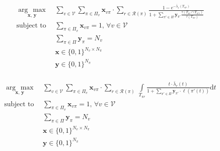 \documentclass[letterpaper, 10pt, conference]{ieeeconf}
\newcommand{\argmax}[1]{\underset{#1}{\operatorname{arg}\,\operatorname{max}}\;}
\newcommand{\Sum}[1]{\displaystyle\sum\limits_{#1}}
\newcommand{\Int}[1]{\displaystyle\int\limits_{#1}}
\newcommand{\bx}[0]{\ensuremath{\mathbf{x}}}
\newcommand{\by}[0]{\ensuremath{\mathbf{y}}}
\begin{document}
\begin{equation*}
\begin{array}{lll}
\argmax{\bx, \, \by}  & \Sum{v \in \mathcal{V}}
    \Sum{\pi \in \Pi_v} \bx_{v\pi} \cdot
    \Sum{r \in \mathcal{R}(\pi)}
    \frac{1 - e^{-\bar{\lambda}_r(T_{\pi r})}}
    {1 + \Sum{\pi' \in \Pi} \by_{\pi'} \frac{\tau(T_{\pi r} \cap T_{\pi' r})}
    {\tau(T_{\pi r})}}& \\
\text{subject to}
    & \Sum{\pi \in \Pi_v} \bx_{v\pi} = 1, \, \forall v \in \mathcal{V} \\
    & \Sum{\pi \in \Pi} \by_{\pi} = N_v \\
    & \bx \in \{0, 1\} ^ {N_v \times N_\pi} \\
    & \by \in \{0, 1\} ^ {N_\pi} \\

\end{array}
\end{equation*}

\begin{equation*}
\begin{array}{lll}
\argmax{\bx, \, \by}  & \Sum{v \in \mathcal{V}}
    \Sum{\pi \in \Pi_v} \bx_{v\pi} \cdot
    \Sum{r \in \mathcal{R}(\pi)} \,
    \Int{T_{\pi r}}
    \frac{t \cdot \bar{\lambda}_r(t)}
    {1 + \sum\limits_{\pi' \in \Pi} \by_{\pi'} \cdot \ell(\pi'(t))} \text{d}t& \\
\text{subject to}
    & \Sum{\pi \in \Pi_v} \bx_{v\pi} = 1, \, \forall v \in \mathcal{V} \\
    & \Sum{\pi \in \Pi} \by_{\pi} = N_v \\
    & \bx \in \{0, 1\} ^ {N_v \times N_\pi} \\
    & \by \in \{0, 1\} ^ {N_\pi} \\

\end{array}
\end{equation*}




\end{document}
